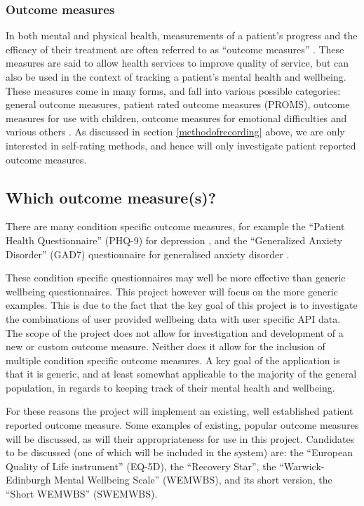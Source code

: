 \documentclass[11pt,openright,a4paper]{report}
\begin{document}
\subsubsection{Outcome measures}
In both mental and physical health, measurements of a patient's progress and the efficacy of their treatment are often referred to as \enquote{outcome measures} \parencite{pediaoutcomemeasures}. These measures are said to allow health services to improve quality of service, but can also be used in the context of tracking a patient's mental health and wellbeing. These measures come in many forms, and fall into various possible categories: general outcome measures, patient rated outcome measures (PROMS), outcome measures for use with children, outcome measures for emotional difficulties and various others \parencite{mhpoutcomemeasures}. As discussed in section \ref{methodofrecording} above, we are only interested in self-rating methods, and hence will only investigate patient reported outcome measures.

\subsection{Which outcome measure(s)?} \label{whichoutcomemeasures}
There are many condition specific outcome measures, for example the \enquote{Patient Health Questionnaire} (PHQ-9) for depression \parencite{kroenke2001phq}, and the \enquote{Generalized Anxiety Disorder} (GAD7) questionnaire for generalised anxiety disorder \parencite{spitzer2006brief}.

These condition specific questionnaires may well be more effective than generic wellbeing questionnaires. This project however will focus on the more generic examples. This is due to the fact that the key goal of this project is to investigate the combinations of user provided wellbeing data with user specific API data. The scope of the project does not allow for investigation and development of a new or custom outcome measure. Neither does it allow for the inclusion of multiple condition specific outcome measures. A key goal of the application is that it is generic, and at least somewhat applicable to the majority of the general population, in regards to keeping track of their mental health and wellbeing.

For these reasons the project will implement an existing, well established patient reported outcome measure. Some examples of existing, popular outcome measures will be discussed, as will their appropriateness for use in this project. Candidates to be discussed (one of which will be included in the system) are: the \enquote{European Quality of Life instrument} (EQ-5D), the \enquote{Recovery Star}, the \enquote{Warwick-Edinburgh Mental Wellbeing Scale} (WEMWBS), and its short version, the \enquote{Short WEMWBS} (SWEMWBS).
\end{document}
